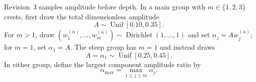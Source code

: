 \documentclass[11pt]{article}
\begin{document}
Revision~3 samples amplitude before depth.  In a main group with
$m\in\{1,2,3\}$ crests, first draw the total dimensionless amplitude
\begin{equation}
  A\sim\operatorname{Unif}[0.10,0.35].
  \label{eq:tanaka-main-total-amplitude}
\end{equation}
For $m>1$, draw
$(w_1^{(\alpha)},\ldots,w_m^{(\alpha)})
\sim\operatorname{Dirichlet}(1,\ldots,1)$ and set
$\alpha_j=Aw_j^{(\alpha)}$; for $m=1$, set $\alpha_1=A$.
The steep group has $m=1$ and instead draws
\begin{equation}
  A=\alpha_1\sim\operatorname{Unif}[0.25,0.45].
  \label{eq:tanaka-steep-amplitude}
\end{equation}
In either group, define the largest component amplitude ratio by
\begin{equation}
  \alpha_{\max}=\max_{1\leq j\leq m}\alpha_j.
\end{equation}
\end{document}
